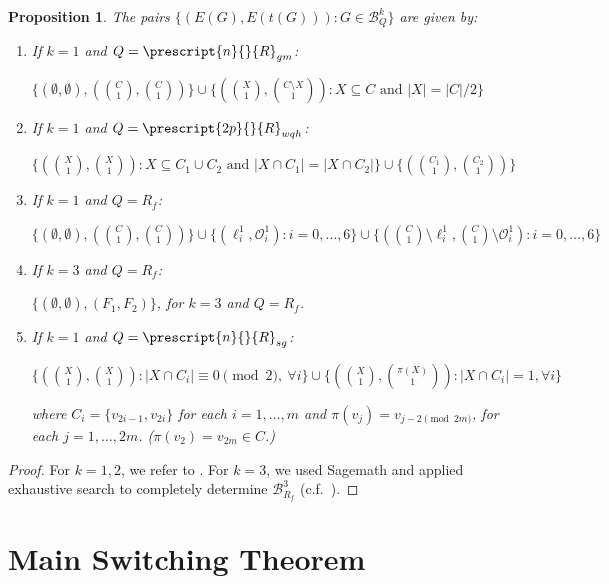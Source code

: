 \documentclass[12pt]{article}
\numberwithin{equation}{section}
\newtheorem{proposition}[theorem]{Proposition}
\theoremstyle{definition}
\newcommand{\ev}[1]{( #1 )}
\begin{document}
\begin{proposition}
\label{prop:exhaustive_data}
\leavevmode
The pairs $ \{ \ev{ E(G), E(t\ev{G}) }: G \in \mathcal{B}^{k}_Q \}$ are given by:
\begin{enumerate}
\item[(i)] If $k=1$ and $Q = \prescript{n}{}{R}_{gm}$: 

$ \{ (\emptyset,\emptyset), (\binom{C}{1} ,\binom{C}{1}) \} \cup \{ (\binom{X}{1}, \binom{C\setminus X}{1}) :  X \subseteq C \text{ and } |X| = |C|/2 \} $  

\item[(ii)] If $k=1$ and $Q = \prescript{2p}{}{R}_{wqh}$: 

$ \{(\binom{X}{1},\binom{X}{1}): X \subseteq C_1\cup C_2 \text{ and } |X \cap C_1| = |X \cap C_2| \} \cup \{ (\binom{C_1}{1}, \binom{C_2}{1}) \} $

\item[(iii)] If $k=1$ and $Q = R_f$: 

$\{ (\emptyset,\emptyset), ( \binom{C}{1}, \binom{C}{1} ) \} \cup \{ \ev{ \ell_i^1, \mathcal{O}_i^1 }: i=0,\ldots,6 \} \cup \{ \ev{ \binom{C}{1} \setminus \ell_i^1, \binom{C}{1} \setminus \mathcal{O}_i^1 }  : i=0,\ldots,6 \}$

\item[(iv)] If $k=3$ and $Q = R_f$: 

$ \{ (\emptyset,\emptyset), \ev{ F_1 , F_2 } \}$, for $k=3$ and $Q = R_f$. 

\item[(v)] If $k=1$ and $Q = \prescript{n}{}{R}_{sg}$: 

$ \{ \ev{ \binom{X}{1}, \binom{X}{1} } : |X \cap C_i| \equiv 0 \pmod{2},\ \forall i \} \cup \{ \ev{ \binom{X}{1}, \binom{\pi(X)}{1} }: |X\cap C_i| = 1, \forall i \}$

where $C_i = \{ v_{2i-1}, v_{2i} \}$ for each $i=1,\ldots,m$ and $\pi\ev{ v_j } = v_{j-2 \pmod{2m}}$, for each $j=1,\ldots,2m$. ($\pi\ev{v_2} = v_{2m} \in C$.)
\end{enumerate}
\end{proposition}
\begin{proof}
For $k=1,2$, we refer to . For $k=3$, we used Sagemath and applied exhaustive search to completely determine $\mathcal{B}^{3}_{R_f}$ (c.f.~\cite{github}). 
\end{proof}

\section{Main Switching Theorem}
\end{document}
